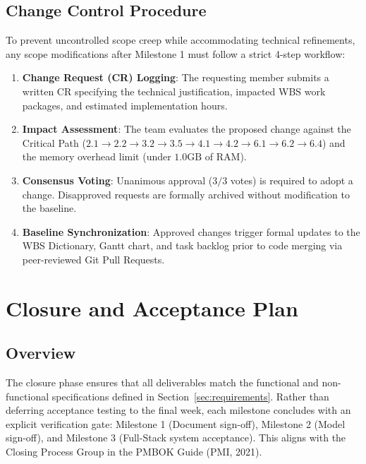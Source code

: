 \documentclass[11pt, a4paper]{article}
\begin{document}
\subsection{Change Control Procedure}
To prevent uncontrolled scope creep while accommodating technical refinements, any scope modifications after Milestone 1 must follow a strict 4-step workflow:
\begin{enumerate}
  \item \textbf{Change Request (CR) Logging}: The requesting member submits a written CR specifying the technical justification, impacted WBS work packages, and estimated implementation hours.
  \item \textbf{Impact Assessment}: The team evaluates the proposed change against the Critical Path ($2.1 \to 2.2 \to 3.2 \to 3.5 \to 4.1 \to 4.2 \to 6.1 \to 6.2 \to 6.4$) and the memory overhead limit (under $1.0\text{GB}$ of RAM).
  \item \textbf{Consensus Voting}: Unanimous approval ($3/3$ votes) is required to adopt a change. Disapproved requests are formally archived without modification to the baseline.
  \item \textbf{Baseline Synchronization}: Approved changes trigger formal updates to the WBS Dictionary, Gantt chart, and task backlog prior to code merging via peer-reviewed Git Pull Requests.
\end{enumerate}

\section{Closure and Acceptance Plan}
\label{sec:closure}

\subsection{Overview}
The closure phase ensures that all deliverables match the functional and non-functional specifications defined in Section~\ref{sec:requirements}. Rather than deferring acceptance testing to the final week, each milestone concludes with an explicit verification gate: Milestone 1 (Document sign-off), Milestone 2 (Model sign-off), and Milestone 3 (Full-Stack system acceptance). This aligns with the Closing Process Group in the PMBOK Guide (PMI, 2021).
\end{document}
